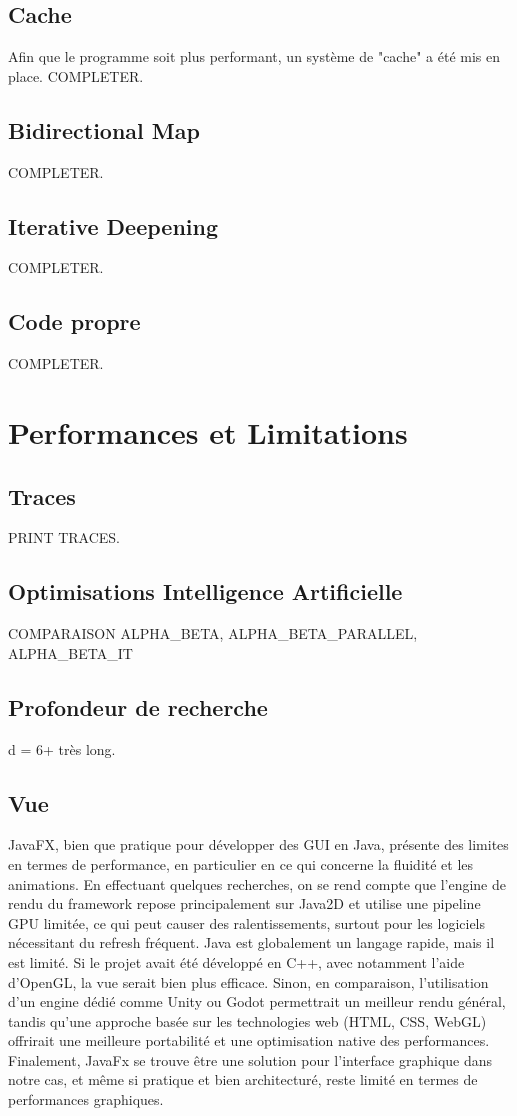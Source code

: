\documentclass{article}
\begin{document}
\subsection{Cache}
Afin que le programme soit plus performant, un système de "cache" a été mis en place. COMPLETER.

\subsection{Bidirectional Map}
COMPLETER.

\subsection{Iterative Deepening}
COMPLETER.

\subsection{Code propre}
COMPLETER.

\section{Performances et Limitations}
\subsection{Traces}
PRINT TRACES.

\subsection{Optimisations Intelligence Artificielle}
COMPARAISON ALPHA\_BETA, ALPHA\_BETA\_PARALLEL, ALPHA\_BETA\_IT

\subsection{Profondeur de recherche}
d = 6+ très long.

\subsection{Vue}
JavaFX, bien que pratique pour développer des GUI en Java, présente des limites en termes de performance, en particulier en ce qui concerne
la fluidité et les animations. En effectuant quelques recherches, on se rend compte que l'engine de rendu du framework repose principalement
sur Java2D et utilise une pipeline GPU limitée, ce qui peut causer des ralentissements, surtout pour les logiciels nécessitant du refresh
fréquent. Java est globalement un langage rapide, mais il est limité. Si le projet avait été développé en C++, avec notamment
l'aide d'OpenGL, la vue serait bien plus efficace. Sinon, en comparaison, l'utilisation d'un engine dédié comme Unity ou Godot permettrait
un meilleur rendu général, tandis qu'une approche basée sur les technologies web (HTML, CSS, WebGL) offrirait une meilleure portabilité et une
optimisation native des performances. Finalement, JavaFx se trouve être une solution pour l'interface graphique dans notre cas, et même si
pratique et bien architecturé, reste limité en termes de performances graphiques.
\end{document}

